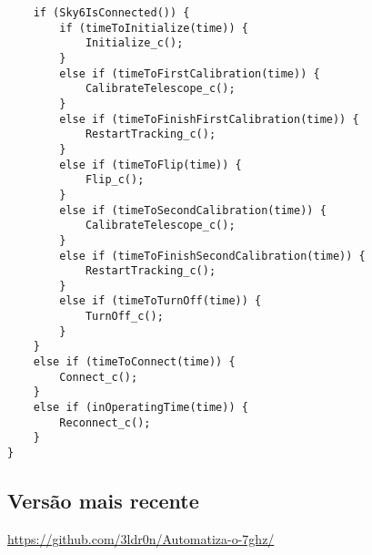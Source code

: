 \documentclass{article}
\begin{document}
\begin{lstlisting}
    if (Sky6IsConnected()) {
        if (timeToInitialize(time)) {
            Initialize_c();
        }
        else if (timeToFirstCalibration(time)) {
            CalibrateTelescope_c();
        }
        else if (timeToFinishFirstCalibration(time)) {
            RestartTracking_c();
        }
        else if (timeToFlip(time)) {
            Flip_c();
        }
        else if (timeToSecondCalibration(time)) {
            CalibrateTelescope_c();
        }
        else if (timeToFinishSecondCalibration(time)) {
            RestartTracking_c();
        }
        else if (timeToTurnOff(time)) {
            TurnOff_c();
        }
    }
    else if (timeToConnect(time)) {
        Connect_c();
    }
    else if (inOperatingTime(time)) {
        Reconnect_c();
    }
}
\end{lstlisting}

\subsection{Versão mais recente}

\href{''https://github.com/3ldr0n/Automatiza-o-7ghz/''}{https://github.com/3ldr0n/Automatiza-o-7ghz/}
\end{document}
